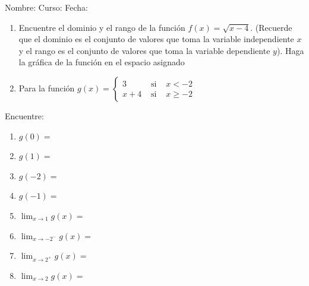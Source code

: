 \documentclass[letterpaper,fleqn]{article}
\newcommand{\LineaNombre}{%
\par
\vspace{\baselineskip}
Nombre:\hrulefill \; Curso: \underline{\hspace*{48pt}} \; Fecha: \underline{\hspace*{2.5cm}} \relax
\par}
\let\ds\displaystyle
\begin{document}
\LineaNombre
\begin{enumerate}
 \item Encuentre el dominio y el rango de la función $f(x)=\sqrt{x-4}$. (Recuerde que el dominio es el conjunto de valores que toma la variable independiente $x$ y el rango es el conjunto de valores que toma la variable dependiente $y$). Haga la gráfica de la función en el espacio asignado
 
 \noanswer
 \newpage
 \item Para la función $g(x)=\left\{\begin{array}{lcl}
 3 & \mbox{ si } & x<-2\\
 x+4 & \mbox{ si } & x\geq -2
 \end{array}\right.$
 \end{enumerate}
 Encuentre:
\begin{enumerate}
\item $g(0)=$
\item $g(1)=$
\item $g(-2)=$
\item $g(-1)=$
\item $\ds{\lim_{x\rightarrow 1}g(x)}=$
\item $\ds{\lim_{x\rightarrow -2^{-}}g(x)}=$
\item $\ds{\lim_{x\rightarrow 2^{+}}g(x)}=$
\item $\ds{\lim_{x\rightarrow 2}g(x)}=$
\end{enumerate}
\end{document}
